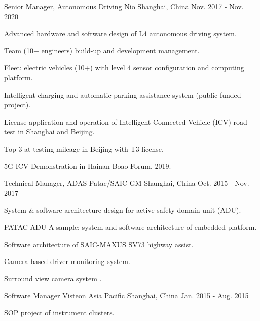 \documentclass[../cv.tex]{subfiles}
\begin{document}
\begin{cventries}
  \cventry
    {Senior Manager, Autonomous Driving} %
    {Nio} %
    {Shanghai, China} %
    {Nov. 2017 - Nov. 2020} %
    {
      \begin{cvitems}
        \item Advanced hardware and software design of L4 autonomous driving system.
        \item Team (10+ engineers) build-up and development management.
        \item Fleet: electric vehicles (10+) with level 4 sensor configuration and computing platform.
        \item Intelligent charging and automatic parking assistance system (public funded project).
        \item License application and operation of Intelligent Connected Vehicle (ICV) road test in Shanghai and Beijing.
        \item Top 3 at testing mileage in Beijing with T3 license.
        \item 5G ICV Demonstration in Hainan Boao Forum, 2019.
      \end{cvitems}
    }

  \cventry
    {Technical Manager, ADAS} %
    {Patac/SAIC-GM} %
    {Shanghai, China} %
    {Oct. 2015 - Nov. 2017} %
    {
      \begin{cvitems}
        \item System \& software architecture design for active safety domain unit (ADU).
        \item PATAC ADU A sample: system and software architecture of embedded platform.
        \item Software architecture of SAIC-MAXUS SV73 highway assist.
        \item Camera based driver monitoring system.
        \item Surround view camera system \supercite{Xin_RearView_17}.
      \end{cvitems}
    }


  \cventry
    {Software Manager} %
    {Visteon Asia Pacific} %
    {Shanghai, China} %
    {Jan. 2015 - Aug. 2015} %
    {
      \begin{cvitems}
        \item SOP project of instrument clusters.
      \end{cvitems}
    }


\end{cventries}
\end{document}
